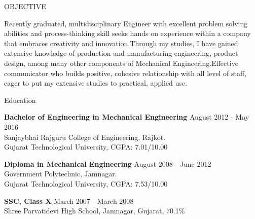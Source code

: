 \documentclass{resume} %
\begin{document}

\begin{rSection}{OBJECTIVE}

{Recently graduated, multidisciplinary Engineer with excellent problem solving abilities and process-thinking skill seeks hands on experience within a company that embraces creativity and innovation.Through my studies, I have gained extensive knowledge of production and manufacturing engineering, product design, among many other components of  Mechanical Engineering.Effective communicator who builds positive, cohesive relationship with all level of staff, eager to put my extensive studies to practical, applied use.}


\end{rSection}

\begin{rSection}{Education}

{\bf Bachelor of Engineering in Mechanical Engineering} \hfill {August 2012 - May 2016}
\\ 
Sanjaybhai Rajguru College of Engineering, Rajkot. 
\\
Gujarat Technological University,  CGPA: 7.01/10.00  

{\bf Diploma in Mechanical Engineering} \hfill {August 2008 - June 2012}
\\ 
Government Polytechnic, Jamnagar.
\\
Gujarat Technological University,  CGPA: 7.53/10.00

{\textbf{SSC, Class X}}  \hfill March 2007 - March  2008\\
Shree Parvatidevi High School, Jamnagar, Gujarat, 70.1\% 


\end{rSection}
\end{document}

